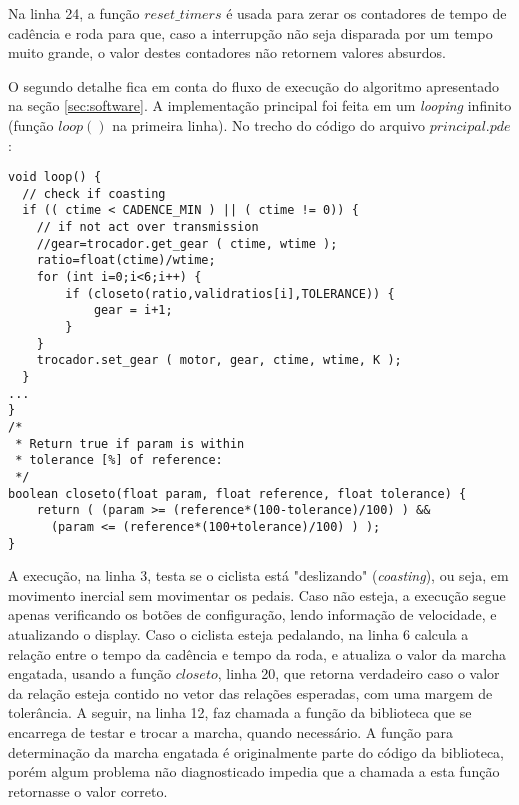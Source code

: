 \documentclass[a4paper,11pt]{article}
\begin{document}
Na linha 24, a função $reset\_timers$ é usada para zerar os contadores de tempo
de cadência e roda para que, caso a interrupção não seja disparada por um tempo
muito grande, o valor destes contadores não retornem valores absurdos.

O segundo detalhe fica em conta do fluxo de execução do algoritmo apresentado
na seção \ref{sec:software}. A implementação principal foi feita em um
\textit{looping} infinito (função $loop()$ na primeira linha). No trecho do
código do arquivo $principal.pde$:

\begin{lstlisting}
void loop() {
  // check if coasting
  if (( ctime < CADENCE_MIN ) || ( ctime != 0)) {
    // if not act over transmission
    //gear=trocador.get_gear ( ctime, wtime );
    ratio=float(ctime)/wtime;
    for (int i=0;i<6;i++) {
        if (closeto(ratio,validratios[i],TOLERANCE)) {
            gear = i+1;
        }
    }
    trocador.set_gear ( motor, gear, ctime, wtime, K );
  }
...
}
/*
 * Return true if param is within
 * tolerance [%] of reference:
 */
boolean closeto(float param, float reference, float tolerance) {
    return ( (param >= (reference*(100-tolerance)/100) ) &&
      (param <= (reference*(100+tolerance)/100) ) );
}
\end{lstlisting}
A execução, na linha 3, testa se o ciclista está "deslizando"
(\textit{coasting}), ou seja, em movimento inercial sem movimentar os pedais.
Caso não esteja, a execução segue apenas verificando os botões de configuração,
lendo informação de velocidade, e atualizando o display. Caso o ciclista esteja
pedalando, na linha 6 calcula a relação entre o tempo da cadência e tempo da
roda, e atualiza o valor da marcha engatada, usando a função $closeto$,
linha 20, que retorna verdadeiro caso o valor da relação esteja contido no
vetor das relações esperadas, com uma margem de tolerância. A seguir, na linha
12, faz chamada a função da biblioteca que se encarrega de testar e trocar a
marcha, quando necessário.
A função para determinação da marcha engatada é originalmente parte do código da
biblioteca, porém algum problema não diagnosticado impedia que a chamada a esta
função retornasse o valor correto.
\end{document}
